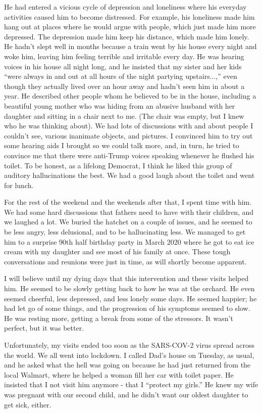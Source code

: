 \documentclass{article}
\begin{document}
He had entered a vicious cycle of depression and loneliness where his everyday activities caused him to become distressed. For example, his loneliness made him hang out at places where he would argue with people, which just made him more depressed. The depression made him keep his distance, which made him lonely. He hadn't slept well in months because a train went by his house every night and woke him, leaving him feeling terrible and irritable every day. He was hearing voices in his house all night long, and he insisted that my sister and her kids ``were always in and out at all hours of the night partying upstairs...,'' even though they actually lived over an hour away and hadn't seen him in about a year. He described other people whom he believed to be in the house, including a beautiful young mother who was hiding from an abusive husband with her daughter and sitting in a chair next to me. (The chair was empty, but I knew who he was thinking about).  We had lots of discussions with and about people I couldn't see, various inanimate objects, and pictures. I convinced him to try out some hearing aids I brought so we could talk more, and, in turn, he tried to convince me that there were anti-Trump voices speaking whenever he flushed his toilet. To be honest, as a lifelong Democrat, I think he liked this group of auditory hallucinations the best. We had a good laugh about the toilet and went for lunch.

For the rest of the weekend and the weekends after that, I spent time with him. We had some hard discussions that fathers need to have with their children, and we laughed a lot. We buried the hatchet on a couple of issues, and he seemed to be less angry, less delusional, and to be hallucinating less. We managed to get him to a surprise 90th half birthday party in March 2020 where he got to eat ice cream with my daughter and see most of his family at once. These tough conversations and reunions were just in time, as will shortly become apparent.

I will believe until my dying days that this intervention and these visits helped him. He seemed to be  slowly getting back to how he was at the orchard. He even seemed cheerful, less depressed, and less lonely some days. He seemed happier; he had let go of some things, and the progression of his symptoms seemed to slow. He was resting more, getting a break from some of the stressors. It wasn't perfect, but it was better.

Unfortunately, my visits ended too soon as the SARS-COV-2 virus spread across the world. We all went into lockdown. I called Dad's house on Tuesday, as usual, and he asked what the hell was going on because he had just returned from the local Walmart, where he helped a woman fill her car with toilet paper. He insisted that I not visit him anymore - that I ``protect my girls.'' He knew my wife was pregnant with our second child, and he didn't want our oldest daughter to get sick, either.
\end{document}
